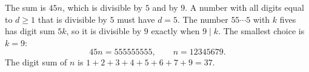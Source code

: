 The sum is $45n$, which is divisible by $5$ and by $9$. A number with all digits equal to $d\ge1$ that is divisible by $5$ must have $d=5$. The number $55\cdots5$ with $k$ fives has digit sum $5k$, so it is divisible by $9$ exactly when $9\mid k$. The smallest choice is $k=9$:
\[45n=555555555,\qquad n=12345679.\]
The digit sum of $n$ is $1+2+3+4+5+6+7+9=\boxed{37}$.
